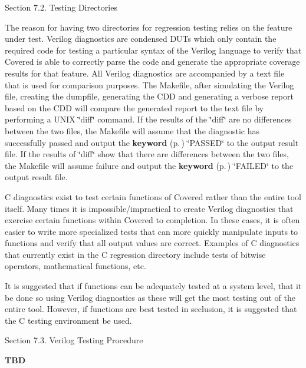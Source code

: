 \begin{Desc}
\item[Section 7.2.  Testing Directories]\par
 The reason for having two directories for regression testing relies on the feature under test. Verilog diagnostics are condensed DUTs which only contain the required code for testing a particular syntax of the Verilog language to verify that Covered is able to correctly parse the code and generate the appropriate coverage results for that feature. All Verilog diagnostics are accompanied by a text file that is used for comparison purposes. The Makefile, after simulating the Verilog file, creating the dumpfile, generating the CDD and generating a verbose report based on the CDD will compare the generated report to the text file by performing a UNIX \char`\"{}diff\char`\"{} command. If the results of the \char`\"{}diff\char`\"{} are no differences between the two files, the Makefile will assume that the diagnostic has successfully passed and output the {\bf keyword} {\rm (p.\,\pageref{structkeyword})} \char`\"{}PASSED\char`\"{} to the output result file. If the results of \char`\"{}diff\char`\"{} show that there are differences between the two files, the Makefile will assume failure and output the {\bf keyword} {\rm (p.\,\pageref{structkeyword})} \char`\"{}FAILED\char`\"{} to the output result file.

 C diagnostics exist to test certain functions of Covered rather than the entire tool itself. Many times it is impossible/impractical to create Verilog diagnostics that exercise certain functions within Covered to completion. In these cases, it is often easier to write more specialized tests that can more quickly manipulate inputs to functions and verify that all output values are correct. Examples of C diagnostics that currently exist in the C  regression directory include tests of bitwise operators, mathematical functions, etc.

 It is suggested that if functions can be adequately tested at a system level, that it be done so using Verilog diagnostics as these will get the most testing out of the entire tool. However, if functions are best tested in seclusion, it is suggested that the C testing environment be used.\end{Desc}


\begin{Desc}
\item[Section 7.3.  Verilog Testing Procedure]\par
 {\bf TBD}\end{Desc}


